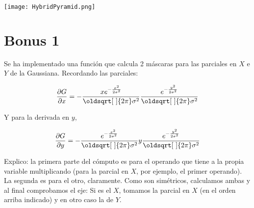 \documentclass[a4paper, 11pt]{article}
\theoremstyle{definition}
\renewcommand*{\sqrt}[2][\ ]{\oldsqrt[#1]{#2} }
\begin{document}
  \centerline{\texttt{[image: HybridPyramid.png]}}

  \section{Bonus 1}

  Se ha implementado una función que calcula 2 máscaras para las parciales en $X$ e $Y$
  de la Gaussiana. Recordando las parciales:

  \[
   \frac{\partial G}{\partial x} = - \frac{x e^{- \frac{x^{2}}{2 \sigma^{2}}}}{\sqrt{2 \pi} \sigma^{2}} \frac{e^{- \frac{y^{2}}{2 \sigma^{2}}}}{\sqrt{2 \pi} \sigma^{2}}
  \]

  Y para la derivada en $y$,

  \[
   \frac{\partial G}{\partial y} = - \frac{e^{- \frac{x^{2}}{2 \sigma^{2}}}}{\sqrt{2 \pi} \sigma^{2}} y\frac{e^{- \frac{y^{2}}{2 \sigma^{2}}}}{\sqrt{2 \pi} \sigma^{2}}
  \]

  Explico: la primera parte del cómputo es para el operando que tiene a la propia
  variable multiplicando (para la parcial en $X$, por ejemplo, el primer operando).
  La segunda es para el otro, claramente. Como son simétricos, calculamos ambas
  y al final comprobamos el eje: Si es el $X$, tomamos la parcial en $X$ (en el orden
  arriba indicado) y en otro caso la de $Y$.
\end{document}
